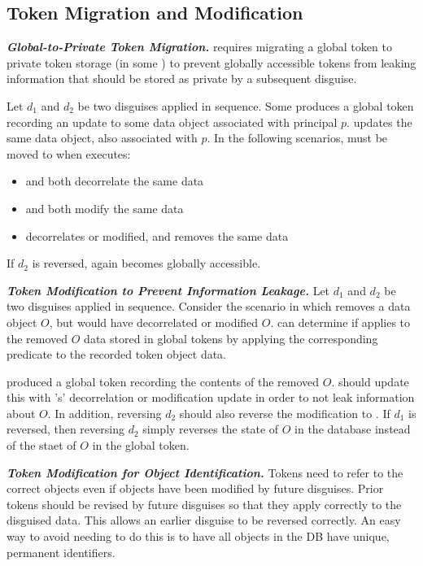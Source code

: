 \subsection{Token Migration and Modification}
\noindent\textbf{\emph{Global-to-Private Token Migration.}}
\sys requires migrating a global token to private token storage (in some ) to prevent
globally accessible tokens from leaking information that should be stored as private by a subsequent
disguise.

Let $d_1$ and $d_2$ be two disguises applied in sequence.
Some  produces a global token  recording an update to some data object
associated with principal $p$.  updates the same data object, also associated with $p$.
In the following scenarios,  must be moved to  when  executes:
\begin{itemize}
\item {} and  both decorrelate the same data
\item {} and  both modify the same data
\item {} decorrelates or modified, and  removes the same data
\end{itemize}
If $d_2$ is reversed,  again becomes globally accessible.

\vspace{6pt}\noindent\textbf{\emph{Token Modification to Prevent Information Leakage.}}
Let $d_1$ and $d_2$ be two disguises applied in sequence.
Consider the scenario in which  removes a data object $O$, but  would have decorrelated
or modified $O$.
\sys can determine if  applies to the removed $O$ data stored in global tokens by applying
the corresponding  predicate to the recorded token object data.

 produced a global token  recording the contents of the removed $O$.
\sys should update this  with 's' decorrelation or modification update in order
to not leak information about $O$.
In addition, reversing $d_2$ should also reverse the modification to . If $d_1$ is
reversed, then reversing $d_2$ simply reverses the state of $O$ in the database instead of the staet
of $O$ in the global token.

\vspace{6pt}\noindent\textbf{\emph{Token Modification for Object Identification.}}
Tokens need to refer to the correct objects even if objects have been modified by future disguises.
Prior tokens should be revised by future disguises so that they apply correctly to the disguised
data.
This allows an earlier disguise to be reversed correctly.
An easy way to avoid needing to do this is to have all objects in the DB have unique, permanent
identifiers.

